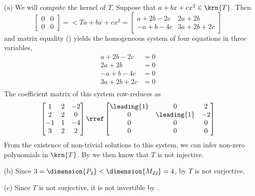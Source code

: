 (a)  We will compute the kernel of $T$.  Suppose that $a+bx+cx^2\in\krn{T}$.  Then
\begin{equation*}
\begin{bmatrix}0 & 0 \\ 0 & 0\end{bmatrix}
=\lt{T}{a+bx+cx^2}
=
\begin{bmatrix}
a+2b-2c & 2a+2b \\
-a+b-4c & 3a+2b+2c
\end{bmatrix}
\end{equation*}
%
and matrix equality () yields the homogeneous system of four equations in three variables,
\begin{align*}
a+2b-2c&=0\\ 
2a+2b&=0\\
-a+b-4c&=0\\
3a+2b+2c&=0\\
\end{align*}
%
The coefficient matrix of this system row-reduces as
\begin{equation*}
\begin{bmatrix}
 1 & 2 & -2 \\
 2 & 2 & 0 \\
 -1 & 1 & -4 \\
 3 & 2 & 2
\end{bmatrix}
\rref
\begin{bmatrix}
 \leading{1} & 0 & 2 \\
 0 & \leading{1} & -2 \\
 0 & 0 & 0 \\
 0 & 0 & 0
\end{bmatrix}
\end{equation*}
%
From the existence of non-trivial solutions to this system, we can infer non-zero polynomials in $\krn{T}$.  By  we then know that $T$ is not injective.\par
%
(b)  Since $3=\dimension{P_2}<\dimension{M_{22}}=4$, by  $T$ is not surjective.\par
%
(c)  Since $T$ is not surjective, it is not invertible by .